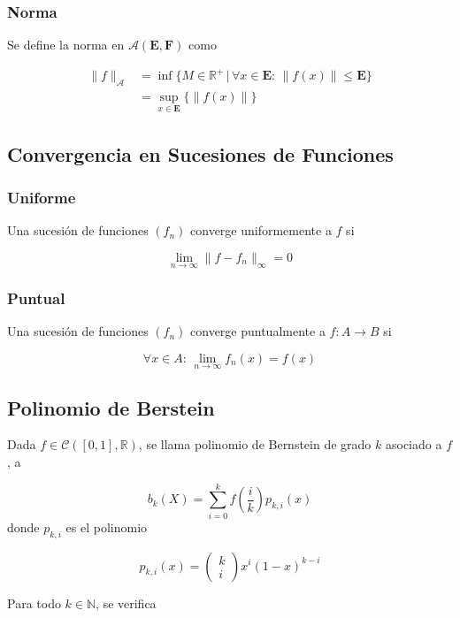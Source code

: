 \subsubsection{Norma}

Se define la norma en $\mathcal{A}(\mathbf{E},\mathbf{F})$ como

\begin{equation}
\begin{split}
\|f\|_{\mathcal{A}} &= \inf\{M\in\mathbb{R}^+\,|\,\forall x\in
\mathbf{E}:\,\|f(x)\|\leq \mathbf{E}\}\\
&= \sup_{x\in\mathbf{E}}\{\|f(x)\|\}
\end{split}
\nonumber
\end{equation}

\subsection{Convergencia en Sucesiones de Funciones}

\subsubsection{Uniforme} Una sucesión de funciones $(f_n)$ converge uniformemente a $f$ si

\[\lim_{n\to\infty}\|f-f_n\|_{\infty}=0\]

\subsubsection{Puntual} Una sucesión de funciones $(f_n)$ converge puntualmente a $f:A\to B$ si

\[\forall x\in A:\,\lim_{n\to\infty}f_n(x)=f(x)\]

\subsection{Polinomio de Berstein}

Dada $f\in\mathcal{C}([0,1],\mathbb{R})$, se llama polinomio de Bernstein de grado $k$ asociado a $f$, a

\[b_k(X) = \sum^k_{i=0}f\left(\frac{i}{k}\right)p_{k,i}(x)\]
\bigbreak
donde $p_{k,i}$ es el polinomio

\[p_{k,i}(x)=\begin{pmatrix}k\\i\end{pmatrix}x^i(1-x)^{k-i}\]
\bigbreak

Para todo $k\in\mathbb{N}$, se verifica

